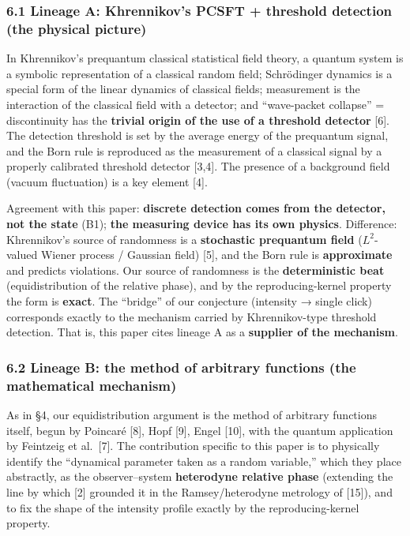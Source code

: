 \documentclass[
]{ltjsarticle}
\begin{document}
\subsubsection{6.1 Lineage A: Khrennikov's PCSFT + threshold detection
(the physical
picture)}\label{lineage-a-khrennikovs-pcsft-threshold-detection-the-physical-picture}

In Khrennikov's prequantum classical statistical field theory, a quantum
system is a symbolic representation of a classical random field;
Schrödinger dynamics is a special form of the linear dynamics of
classical fields; measurement is the interaction of the classical field
with a detector; and ``wave-packet collapse'' = discontinuity has the
\textbf{trivial origin of the use of a threshold detector} {[}6{]}. The
detection threshold is set by the average energy of the prequantum
signal, and the Born rule is reproduced as the measurement of a
classical signal by a properly calibrated threshold detector {[}3,4{]}.
The presence of a background field (vacuum fluctuation) is a key element
{[}4{]}.

Agreement with this paper: \textbf{discrete detection comes from the
detector, not the state} (B1); \textbf{the measuring device has its own
physics}. Difference: Khrennikov's source of randomness is a
\textbf{stochastic prequantum field} (\(L^2\)-valued Wiener process /
Gaussian field) {[}5{]}, and the Born rule is \textbf{approximate} and
predicts violations. Our source of randomness is the
\textbf{deterministic beat} (equidistribution of the relative phase),
and by the reproducing-kernel property the form is \textbf{exact}. The
``bridge'' of our conjecture (intensity → single click) corresponds
exactly to the mechanism carried by Khrennikov-type threshold detection.
That is, this paper cites lineage A as a \textbf{supplier of the
mechanism}.

\subsubsection{6.2 Lineage B: the method of arbitrary functions (the
mathematical
mechanism)}\label{lineage-b-the-method-of-arbitrary-functions-the-mathematical-mechanism}

As in §4, our equidistribution argument is the method of arbitrary
functions itself, begun by Poincaré {[}8{]}, Hopf {[}9{]}, Engel
{[}10{]}, with the quantum application by Feintzeig et al.~{[}7{]}. The
contribution specific to this paper is to physically identify the
``dynamical parameter taken as a random variable,'' which they place
abstractly, as the observer--system \textbf{heterodyne relative phase}
(extending the line by which {[}2{]} grounded it in the
Ramsey/heterodyne metrology of {[}15{]}), and to fix the shape of the
intensity profile exactly by the reproducing-kernel property.
\end{document}
